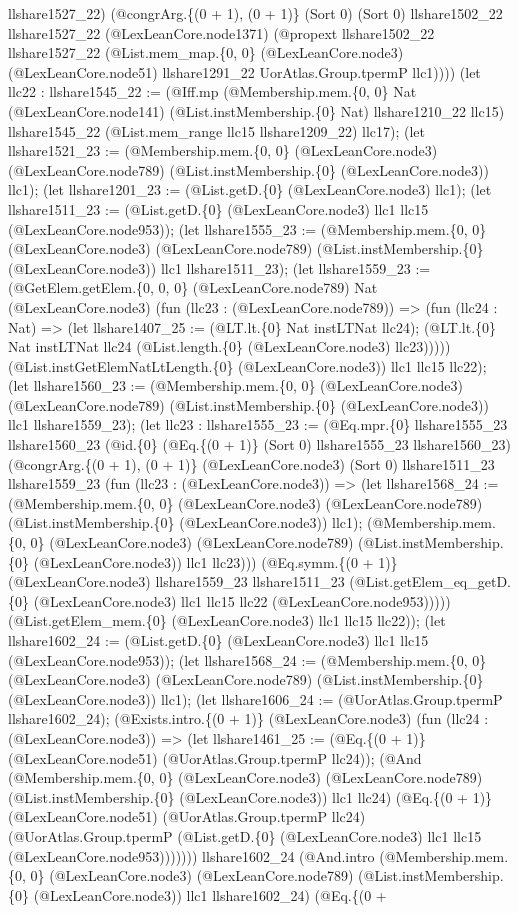 \documentclass[11pt]{article}
\begin{document}
llshare1527\_22) (@congrArg.\{(0 + 1), (0 + 1)\} (Sort 0) (Sort 0) llshare1502\_22 llshare1527\_22 (@LexLeanCore.node1371) (@propext llshare1502\_22 llshare1527\_22 (@List.mem\_map.\{0, 0\} (@LexLeanCore.node3) (@LexLeanCore.node51) llshare1291\_22 UorAtlas.Group.tpermP llc1)))) (let llc22 : llshare1545\_22 := (@Iff.mp (@Membership.mem.\{0, 0\} Nat (@LexLeanCore.node141) (@List.instMembership.\{0\} Nat) llshare1210\_22 llc15) llshare1545\_22 (@List.mem\_range llc15 llshare1209\_22) llc17); (let llshare1521\_23 := (@Membership.mem.\{0, 0\} (@LexLeanCore.node3) (@LexLeanCore.node789) (@List.instMembership.\{0\} (@LexLeanCore.node3)) llc1); (let llshare1201\_23 := (@List.getD.\{0\} (@LexLeanCore.node3) llc1); (let llshare1511\_23 := (@List.getD.\{0\} (@LexLeanCore.node3) llc1 llc15 (@LexLeanCore.node953)); (let llshare1555\_23 := (@Membership.mem.\{0, 0\} (@LexLeanCore.node3) (@LexLeanCore.node789) (@List.instMembership.\{0\} (@LexLeanCore.node3)) llc1 llshare1511\_23); (let llshare1559\_23 := (@GetElem.getElem.\{0, 0, 0\} (@LexLeanCore.node789) Nat (@LexLeanCore.node3) (fun (llc23 : (@LexLeanCore.node789)) => (fun (llc24 : Nat) => (let llshare1407\_25 := (@LT.lt.\{0\} Nat instLTNat llc24); (@LT.lt.\{0\} Nat instLTNat llc24 (@List.length.\{0\} (@LexLeanCore.node3) llc23))))) (@List.instGetElemNatLtLength.\{0\} (@LexLeanCore.node3)) llc1 llc15 llc22); (let llshare1560\_23 := (@Membership.mem.\{0, 0\} (@LexLeanCore.node3) (@LexLeanCore.node789) (@List.instMembership.\{0\} (@LexLeanCore.node3)) llc1 llshare1559\_23); (let llc23 : llshare1555\_23 := (@Eq.mpr.\{0\} llshare1555\_23 llshare1560\_23 (@id.\{0\} (@Eq.\{(0 + 1)\} (Sort 0) llshare1555\_23 llshare1560\_23) (@congrArg.\{(0 + 1), (0 + 1)\} (@LexLeanCore.node3) (Sort 0) llshare1511\_23 llshare1559\_23 (fun (llc23 : (@LexLeanCore.node3)) => (let llshare1568\_24 := (@Membership.mem.\{0, 0\} (@LexLeanCore.node3) (@LexLeanCore.node789) (@List.instMembership.\{0\} (@LexLeanCore.node3)) llc1); (@Membership.mem.\{0, 0\} (@LexLeanCore.node3) (@LexLeanCore.node789) (@List.instMembership.\{0\} (@LexLeanCore.node3)) llc1 llc23))) (@Eq.symm.\{(0 + 1)\} (@LexLeanCore.node3) llshare1559\_23 llshare1511\_23 (@List.getElem\_eq\_getD.\{0\} (@LexLeanCore.node3) llc1 llc15 llc22 (@LexLeanCore.node953))))) (@List.getElem\_mem.\{0\} (@LexLeanCore.node3) llc1 llc15 llc22)); (let llshare1602\_24 := (@List.getD.\{0\} (@LexLeanCore.node3) llc1 llc15 (@LexLeanCore.node953)); (let llshare1568\_24 := (@Membership.mem.\{0, 0\} (@LexLeanCore.node3) (@LexLeanCore.node789) (@List.instMembership.\{0\} (@LexLeanCore.node3)) llc1); (let llshare1606\_24 := (@UorAtlas.Group.tpermP llshare1602\_24); (@Exists.intro.\{(0 + 1)\} (@LexLeanCore.node3) (fun (llc24 : (@LexLeanCore.node3)) => (let llshare1461\_25 := (@Eq.\{(0 + 1)\} (@LexLeanCore.node51) (@UorAtlas.Group.tpermP llc24)); (@And (@Membership.mem.\{0, 0\} (@LexLeanCore.node3) (@LexLeanCore.node789) (@List.instMembership.\{0\} (@LexLeanCore.node3)) llc1 llc24) (@Eq.\{(0 + 1)\} (@LexLeanCore.node51) (@UorAtlas.Group.tpermP llc24) (@UorAtlas.Group.tpermP (@List.getD.\{0\} (@LexLeanCore.node3) llc1 llc15 (@LexLeanCore.node953))))))) llshare1602\_24 (@And.intro (@Membership.mem.\{0, 0\} (@LexLeanCore.node3) (@LexLeanCore.node789) (@List.instMembership.\{0\} (@LexLeanCore.node3)) llc1 llshare1602\_24) (@Eq.\{(0 + 
\end{document}
